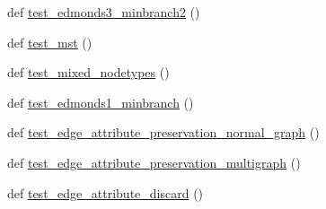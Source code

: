 \begin{DoxyCompactItemize}
\item 
def \hyperlink{namespacenetworkx_1_1algorithms_1_1tree_1_1tests_1_1test__branchings_ac92bd028e79fa454f77384a144fd9321}{test\+\_\+edmonds3\+\_\+minbranch2} ()
\item 
def \hyperlink{namespacenetworkx_1_1algorithms_1_1tree_1_1tests_1_1test__branchings_a538d30b70089326e42d0d554de5e40ad}{test\+\_\+mst} ()
\item 
def \hyperlink{namespacenetworkx_1_1algorithms_1_1tree_1_1tests_1_1test__branchings_ab39dd324f957f125f494a0f1e3b90317}{test\+\_\+mixed\+\_\+nodetypes} ()
\item 
def \hyperlink{namespacenetworkx_1_1algorithms_1_1tree_1_1tests_1_1test__branchings_ad3289b684d7857d3d405a26648a035f5}{test\+\_\+edmonds1\+\_\+minbranch} ()
\item 
def \hyperlink{namespacenetworkx_1_1algorithms_1_1tree_1_1tests_1_1test__branchings_a0a66dd42d65ce6ff70658d846dfc67b4}{test\+\_\+edge\+\_\+attribute\+\_\+preservation\+\_\+normal\+\_\+graph} ()
\item 
def \hyperlink{namespacenetworkx_1_1algorithms_1_1tree_1_1tests_1_1test__branchings_ac750d3642c1bd38c735c1b8599f86691}{test\+\_\+edge\+\_\+attribute\+\_\+preservation\+\_\+multigraph} ()
\item 
def \hyperlink{namespacenetworkx_1_1algorithms_1_1tree_1_1tests_1_1test__branchings_a9ccada85ae8c189e519a94d3ddec97f3}{test\+\_\+edge\+\_\+attribute\+\_\+discard} ()
\end{DoxyCompactItemize}
